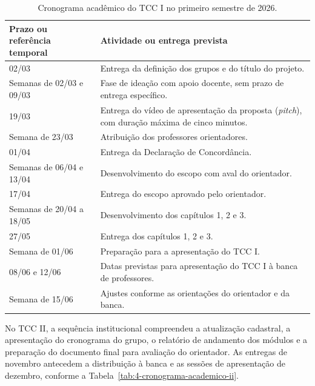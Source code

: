\begin{table}[htbp]
\centering
\caption{Cronograma acadêmico do TCC I no primeiro semestre de 2026.}
\label{tab:4-cronograma-academico}
\small
\begin{tabularx}{\textwidth}{|p{}|X|}
\hline
\textbf{Prazo ou referência temporal} & \textbf{Atividade ou entrega prevista} \\ \hline
02/03 & Entrega da definição dos grupos e do título do projeto. \\ \hline
Semanas de 02/03 e 09/03 & Fase de ideação com apoio docente, sem prazo de entrega específico. \\ \hline
19/03 & Entrega do vídeo de apresentação da proposta (\textit{pitch}), com duração máxima de cinco minutos. \\ \hline
Semana de 23/03 & Atribuição dos professores orientadores. \\ \hline
01/04 & Entrega da Declaração de Concordância. \\ \hline
Semanas de 06/04 e 13/04 & Desenvolvimento do escopo com aval do orientador. \\ \hline
17/04 & Entrega do escopo aprovado pelo orientador. \\ \hline
Semanas de 20/04 a 18/05 & Desenvolvimento dos capítulos 1, 2 e 3. \\ \hline
27/05 & Entrega dos capítulos 1, 2 e 3. \\ \hline
Semana de 01/06 & Preparação para a apresentação do TCC I. \\ \hline
08/06 e 12/06 & Datas previstas para apresentação do TCC I à banca de professores. \\ \hline
Semana de 15/06 & Ajustes conforme as orientações do orientador e da banca. \\ \hline
\end{tabularx}
\par{}
\end{table}

No TCC II, a sequência institucional compreendeu a atualização cadastral, a apresentação do cronograma do grupo, o relatório de andamento dos módulos e a preparação do documento final para avaliação do orientador. As entregas de novembro antecedem a distribuição à banca e as sessões de apresentação de dezembro, conforme a Tabela~\ref{tab:4-cronograma-academico-ii}.


